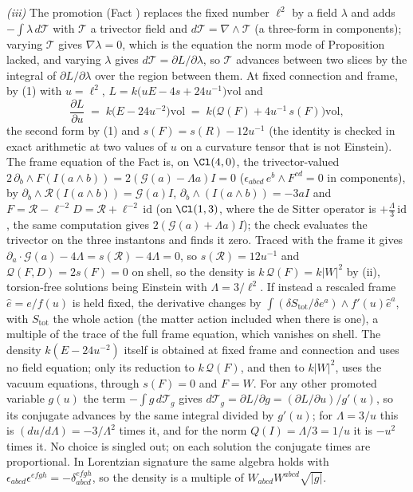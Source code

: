 \emph{(iii)} The promotion (Fact ) replaces the fixed number $\ell^{2}$ by a field $\lambda$ and adds $-\int\lambda\,d\mathcal{T}$ with $\mathcal{T}$ a trivector field and $d\mathcal{T} = \nabla\wedge\mathcal{T}$ (a three-form in components); varying $\mathcal{T}$ gives $\nabla\lambda = 0$, which is the equation the norm mode of Proposition  lacked, and varying $\lambda$ gives $d\mathcal{T} = \partial L/\partial\lambda$, so $\mathcal{T}$ advances between two slices by the integral of $\partial L/\partial\lambda$ over the region between them. At fixed connection and frame, by (1) with $u = \ell^{2}$, $L = k\bigl(uE - 4s + 24u^{-1}\bigr)\mathrm{vol}$ and
\[
\frac{\partial L}{\partial u} \;=\; k\bigl(E - 24u^{-2}\bigr)\mathrm{vol} \;=\; k\bigl(\mathcal{Q}(F) + 4u^{-1}\,s(F)\bigr)\mathrm{vol},
\]
the second form by (1) and $s(F) = s(R) - 12u^{-1}$ (the identity is checked in exact arithmetic at two values of $u$ on a curvature tensor that is not Einstein). The frame equation of the Fact is, on $\Cl(4,0)$, the trivector-valued $2\,\partial_{b}\wedge F(I(a\wedge b)) = 2(\mathcal{G}(a) - \Lambda a)I = 0$ ($\epsilon_{abcd}\,e^{b}\wedge F^{cd} = 0$ in components), by $\partial_{b}\wedge\mathcal{R}(I(a\wedge b)) = \mathcal{G}(a)I$, $\partial_{b}\wedge(I(a\wedge b)) = -3aI$ and $F = \mathcal{R} - \ell^{-2}D = \mathcal{R} + \ell^{-2}\,\mathrm{id}$ (on $\Cl(1,3)$, where the de Sitter operator is $+\tfrac{\Lambda}{3}\,\mathrm{id}$, the same computation gives $2(\mathcal{G}(a) + \Lambda a)I$); the check evaluates the trivector on the three instantons and finds it zero. Traced with the frame it gives $\partial_{a}\cdot\mathcal{G}(a) - 4\Lambda = s(\mathcal{R}) - 4\Lambda = 0$, so $s(\mathcal{R}) = 12u^{-1}$ and $\mathcal{Q}(F, D) = 2s(F) = 0$ on shell, so the density is $k\,\mathcal{Q}(F) = k|W|^{2}$ by (ii), torsion-free solutions being Einstein with $\Lambda = 3/\ell^{2}$. If instead a rescaled frame $\hat e = e/f(u)$ is held fixed, the derivative changes by $\int (\delta S_{\mathrm{tot}}/\delta e^{a})\wedge f'(u)\hat e^{a}$, with $S_{\mathrm{tot}}$ the whole action (the matter action included when there is one), a multiple of the trace of the full frame equation, which vanishes on shell. The density $k(E - 24u^{-2})$ itself is obtained at fixed frame and connection and uses no field equation; only its reduction to $k\,\mathcal{Q}(F)$, and then to $k|W|^{2}$, uses the vacuum equations, through $s(F) = 0$ and $F = W$. For any other promoted variable $g(u)$ the term $-\int g\,d\mathcal{T}_{g}$ gives $d\mathcal{T}_{g} = \partial L/\partial g = (\partial L/\partial u)/g'(u)$, so its conjugate advances by the same integral divided by $g'(u)$; for $\Lambda = 3/u$ this is $(du/d\Lambda) = -3/\Lambda^{2}$ times it, and for the norm $Q(I) = \Lambda/3 = 1/u$ it is $-u^{2}$ times it. No choice is singled out; on each solution the conjugate times are proportional. In Lorentzian signature the same algebra holds with $\epsilon_{abcd}\epsilon^{efgh} = -\delta^{efgh}_{abcd}$, so the density is a multiple of $W_{abcd}W^{abcd}\sqrt{|g|}$.

